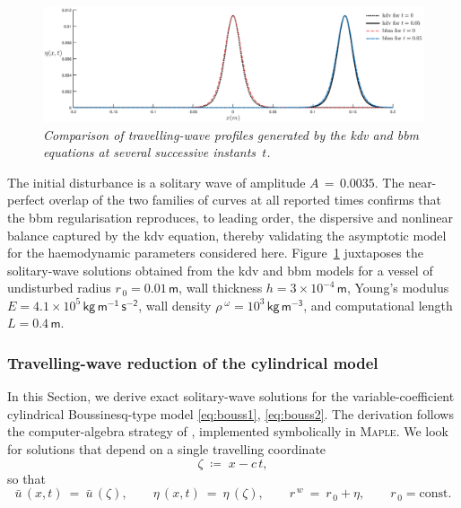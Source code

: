 \documentclass[alpha-refs, 12pt]{wiley-article}
\begin{document}
\begin{figure}
  \centering
  \includegraphics[width=\textwidth]{figs/KdVBBMSW.eps}
  \caption{\emph{Comparison of travelling-wave profiles generated by the \acrshort{kdv} and \acrshort{bbm} equations at several successive instants~$t$.}}
  \label{fig:2}
\end{figure}

The initial disturbance is a solitary wave of amplitude $A\,=\,0.0035$. The near-perfect overlap of the two families of curves at all reported times confirms that the \acrshort{bbm} regularisation reproduces, to leading order, the dispersive and nonlinear balance captured by the \acrshort{kdv} equation, thereby validating the asymptotic model for the haemodynamic parameters considered here. Figure~\ref{fig:2} juxtaposes the solitary-wave solutions obtained from the \acrshort{kdv} and \acrshort{bbm} models for a vessel of undisturbed radius $r_{\,0}=0.01\,\mathsf{m}$, wall thickness $h=3\times10^{-4}\,\mathsf{m}$, Young’s modulus $E=4.1\times10^{5}\,\mathsf{kg\,m^{-1}\,s^{-2}}$, wall density $\rho^{\;\omega}=10^{3}\,\mathsf{kg\,m^{-3}}$, and computational length $L=0.4\,\mathsf{m}$.

\subsubsection{Travelling-wave reduction of the cylindrical model}
\label{sec:cyl_travelling_wave}

In this Section, we derive exact solitary-wave solutions for the variable-coefficient cylindrical Boussinesq-type model \eqref{eq:bouss1}, \eqref{eq:bouss2}. The derivation follows the computer-algebra strategy of \cite{Dutykh2007}, implemented symbolically in \textsc{Maple}. We look for solutions that depend on a single travelling coordinate
\begin{equation*}
  \zeta \;\coloneqq\; x - c\,t,
\end{equation*}
so that
\begin{equation*}
  \bar{u}\,(x,t)\ =\ \bar{u}\,(\zeta), \qquad \eta\,(x,t)\ =\ \eta\,(\zeta), \qquad r^{\,w}\ =\ r_{\,0}+\eta, \qquad r_{\,0}=\text{const}.
\end{equation*}
\end{document}

